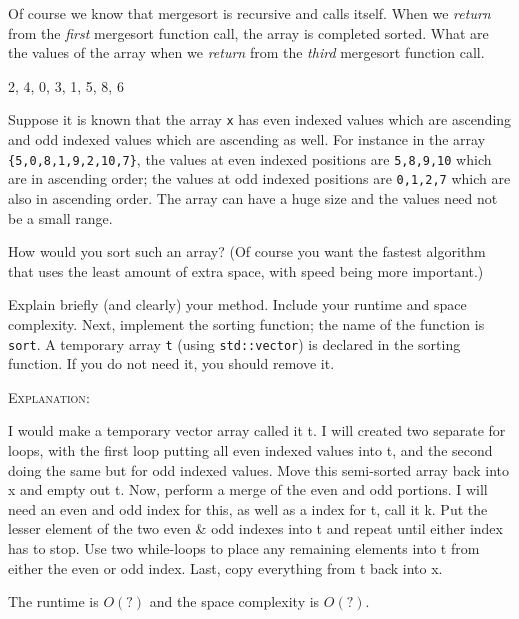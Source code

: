 Of course we know that mergesort is recursive and calls itself.
When we \textit{return} from the \textit{first} mergesort function call,
the array is completed sorted.
What are the values of the array when we \textit{return} from the \textit{third}
mergesort function call.

\ANSWER
\begin{answercode}
{2, 4, 0, 3, 1, 5, 8, 6}
\end{answercode}

\newpage
\nextq
Suppose it is known that the array \verb!x! has even indexed values which are
ascending and odd indexed values which are ascending as well.
For instance in the array \verb!{5,0,8,1,9,2,10,7}!,
the values at even indexed positions are
\verb!5,8,9,10! which are in ascending order;
the values at odd indexed positions are
\verb!0,1,2,7! which are also in ascending order.
The array can have a huge size and the values need not be a small range.

How would you sort such an array?
(Of course you want the fastest algorithm that uses the least amount
of extra space, with speed being more important.)

Explain briefly (and clearly) your method.
Include your runtime and space complexity.
Next, implement the sorting function; the name of the function is \verb!sort!.
A temporary array \verb!t! (using \verb!std::vector!) is declared in the sorting
function.
If you do not need it, you should remove it.

\ANSWER

\textsc{Explanation}:
\begin{answerlong}

I would make a temporary vector array called it t. I will created two separate for loops, with the first loop putting all even indexed values into t, and the second doing the same but for odd indexed values. Move this semi-sorted array back into x and empty out t. Now, perform a merge of the even and odd portions. I will need an even and odd index for this, as well as a index for t, call it k. Put the lesser element of the two even & odd indexes into t and repeat until either index has to stop. Use two while-loops to place any remaining elements into t from either the even or odd index. Last, copy everything from t back into x.

The runtime is $O(?)$ and the space complexity is $O(?)$.
\end{answerlong}  

